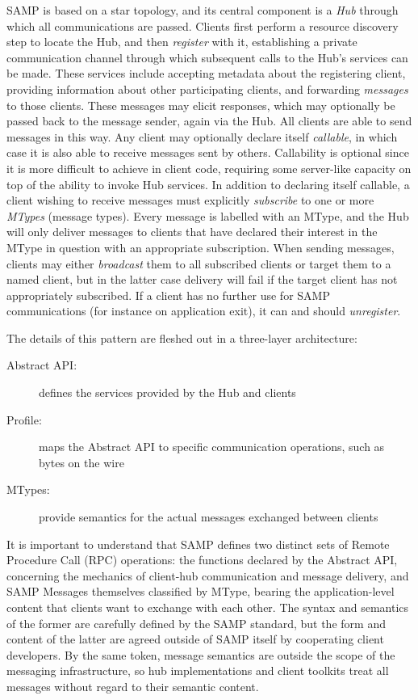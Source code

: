 \documentclass[5p]{elsarticle}
\begin{document}
SAMP is based on a star topology, and its central component is a
{\em Hub\/} through which all communications are passed.
Clients first perform a resource discovery step to locate the Hub,
and then {\em register\/} with it, establishing a private communication
channel through which subsequent calls to the Hub's services can be made.
These services include accepting metadata about the registering client,
providing information about other participating clients,
and forwarding {\em messages\/} to those clients.
These messages may elicit responses, which may optionally be passed
back to the message sender, again via the Hub.
All clients are able to send messages in this way.
Any client may optionally declare itself {\em callable\/},
in which case it is also able to receive messages sent by others.
Callability is optional since it is more difficult to
achieve in client code, requiring some server-like capacity
on top of the ability to invoke Hub services.
In addition to declaring itself callable, a client wishing to
receive messages must explicitly {\em subscribe\/} to one or
more {\em MTypes} (message types).  Every message is labelled
with an MType, and the Hub will only deliver messages to clients
that have declared their interest in the MType in question with
an appropriate subscription.  When sending messages, clients may
either {\em broadcast\/} them to all subscribed clients or
target them to a named client, but in the latter case delivery
will fail if the target client has not appropriately subscribed.
If a client has no further use for SAMP communications
(for instance on application exit), it can and should {\em unregister\/}.

The details of this pattern are fleshed out in a three-layer architecture:
\begin{description}
\item[Abstract API:] defines the services provided by the Hub and clients
\item[Profile:] maps the Abstract API to specific communication operations,
  such as bytes on the wire
\item[MTypes:] provide semantics for the actual messages exchanged between
  clients
\end{description}

It is important to understand that SAMP defines two distinct sets of
Remote Procedure Call (RPC) operations:
the functions declared by the Abstract API,
concerning the mechanics of client-hub communication and message delivery,
and SAMP Messages themselves classified by MType,
bearing the application-level content that clients want
to exchange with each other.
The syntax and semantics of the former are carefully defined by the
SAMP standard, but the form and content of the latter are
agreed outside of SAMP itself by cooperating client developers.
By the same token, message semantics are outside the scope of the
messaging infrastructure, so hub implementations and client toolkits
treat all messages without regard to their semantic content.
\end{document}
